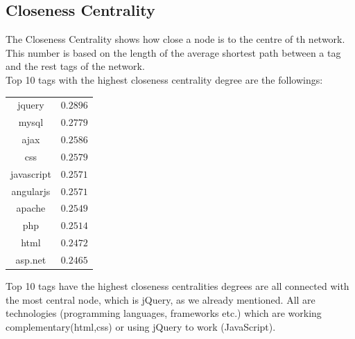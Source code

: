 \documentclass[12pt]{article}
\begin{document}
		\subsection{Closeness Centrality}
		The Closeness Centrality shows how close a node is to the centre of th network. This number is based on the length of the average shortest path between a tag and the rest tags of the network. \\
		Top 10 tags with the highest closeness centrality degree are the followings:
			\begin{center}
				\begin{tabular}{ |c|c| } 
					\hline
					jquery & $0.2896$  \\ 
					mysql & $0.2779$ \\
					ajax & $0.2586$ \\
					css & $0.2579$ \\
					javascript & $0.2571$ \\
					angularjs & $0.2571$ \\
					apache & $0.2549$ \\
					php & $0.2514$ \\
					html & $0.2472$ \\
					asp.net & $0.2465$\\
					\hline
				\end{tabular}
			\end{center} 
		Top 10 tags have the highest closeness centralities degrees are all connected with the most central node, which is jQuery, as we already mentioned. All are technologies (programming languages, frameworks etc.) which  are working complementary(html,css) or using jQuery to work (JavaScript).
\end{document}
